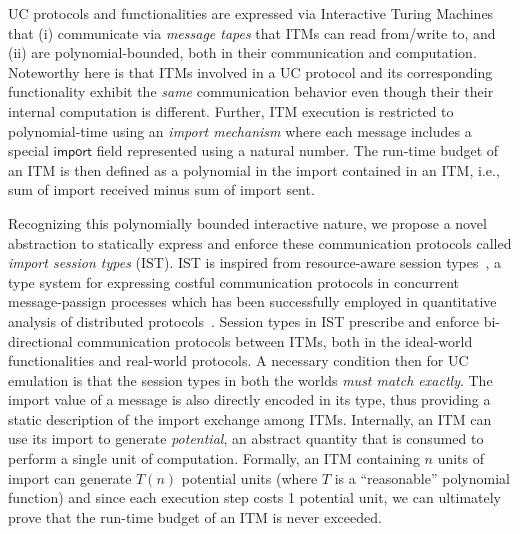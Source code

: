 UC protocols and functionalities are expressed via Interactive Turing Machines that (i) communicate via \emph{message tapes} that ITMs can read from/write to,
and (ii) are polynomial-bounded, both in their communication and computation.
Noteworthy here is that ITMs involved in a UC protocol and its corresponding functionality exhibit the \emph{same} communication behavior even though their
their internal computation is different.
Further, ITM execution is restricted to polynomial-time using an \emph{import mechanism} where each message includes a special $\mathsf{import}$
field represented using a natural number.
The run-time budget of an ITM is then defined as a polynomial in the import contained in an ITM, i.e., sum of import received minus
sum of import sent.

Recognizing this polynomially bounded interactive nature, we propose a novel abstraction to statically express and enforce these
communication protocols called \emph{import session types} (IST).
IST is inspired from resource-aware session types~\cite{das2018work}, a type system for expressing costful communication protocols
in concurrent message-passign processes which has been successfully employed in quantitative analysis of distributed
protocols~\cite{dasnomos,Das20FSCD,Das22LMCS,Das20arxiv}.
Session types in IST prescribe and enforce bi-directional communication protocols between ITMs, both in the ideal-world functionalities and real-world protocols.
A necessary condition then for UC emulation is that the session types in both the worlds \emph{must match exactly}.
The import value of a message is also directly encoded in its type, thus providing a static description of the import exchange
among ITMs.
Internally, an ITM can use its import to generate \emph{potential}, an abstract quantity that is consumed to perform a single
unit of computation.
Formally, an ITM containing $n$ units of import can generate $T(n)$ potential units (where $T$ is a ``reasonable'' polynomial function)
and since each execution step costs 1 potential unit, we can ultimately prove that the run-time budget of an ITM is never exceeded.

